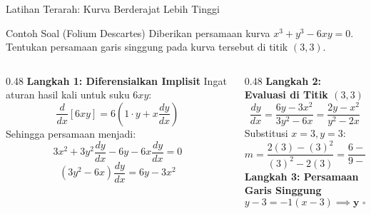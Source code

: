 \documentclass[aspectratio=169,10pt]{beamer}
\begin{document}
\begin{frame}{Latihan Terarah: Kurva Berderajat Lebih Tinggi}
    \begin{block}{Contoh Soal (Folium Descartes)}
        Diberikan persamaan kurva $x^3 + y^3 - 6xy = 0$.
        Tentukan persamaan garis singgung pada kurva tersebut di titik $(3, 3)$.
    \end{block}

    \pause
    \begin{columns}[T]
        \begin{column}{0.48\textwidth}
            \textbf{Langkah 1: Diferensialkan Implisit}
            Ingat aturan hasil kali untuk suku $6xy$:
            \[
                \frac{d}{dx}[6xy] = 6\left( 1 \cdot y + x \frac{dy}{dx} \right)
            \]
            Sehingga persamaan menjadi:
            \[
                3x^2 + 3y^2 \frac{dy}{dx} - 6y - 6x \frac{dy}{dx} = 0
            \]
            \[
                (3y^2 - 6x)\frac{dy}{dx} = 6y - 3x^2
            \]
        \end{column}

        \begin{column}{0.48\textwidth}
            \textbf{Langkah 2: Evaluasi di Titik $(3, 3)$}
            \[
                \frac{dy}{dx} = \frac{6y - 3x^2}{3y^2 - 6x} = \frac{2y - x^2}{y^2 - 2x}
            \]
            Substitusi $x = 3, y = 3$:
            \[
                m = \frac{2(3) - (3)^2}{(3)^2 - 2(3)} = \frac{6 - 9}{9 - 6} = \frac{-3}{3} = \mathbf{-1}
            \]
            \textbf{Langkah 3: Persamaan Garis Singgung}
            \[
                y - 3 = -1(x - 3) \implies \mathbf{y = -x + 6}
            \]
        \end{column}
    \end{columns}
\end{frame}
\end{document}
